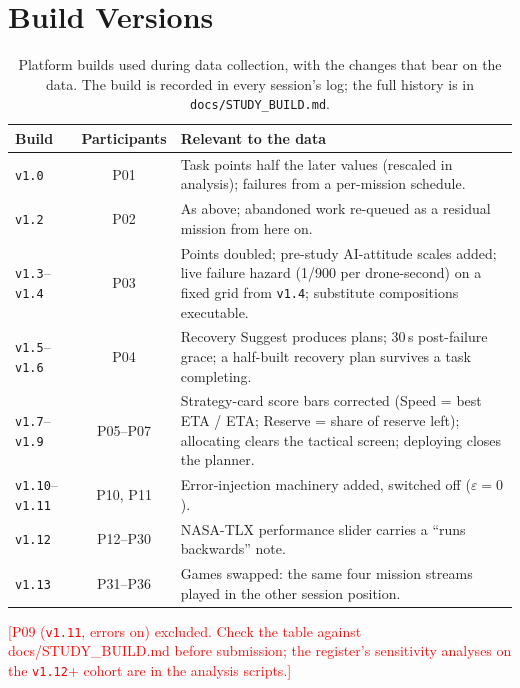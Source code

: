 \documentclass[10pt]{article}
\theoremstyle{definition}
\newcommand{\todo}[1]{\textcolor{red}{[#1]}}
\begin{document}
\section{Build Versions}\label{app:builds}

\begin{table}[htbp]
\centering
\caption{Platform builds used during data collection, with the changes that bear on the data. The build is recorded in
every session's log; the full history is in \texttt{docs/STUDY\_BUILD.md}.}
\label{tab:builds}
\small
\begin{tabularx}{\linewidth}{lcX}
\toprule
\textbf{Build} & \textbf{Participants} & \textbf{Relevant to the data} \\
\midrule
\texttt{v1.0} & P01 & Task points half the later values (rescaled in analysis); failures from a per-mission schedule. \\
\texttt{v1.2} & P02 & As above; abandoned work re-queued as a residual mission from here on. \\
\texttt{v1.3}--\texttt{v1.4} & P03 & Points doubled; pre-study AI-attitude scales added; live failure hazard (1/900 per drone-second) on a fixed grid from \texttt{v1.4}; substitute compositions executable. \\
\texttt{v1.5}--\texttt{v1.6} & P04 & Recovery Suggest produces plans; 30\,s post-failure grace; a half-built recovery plan survives a task completing. \\
\texttt{v1.7}--\texttt{v1.9} & P05--P07 & Strategy-card score bars corrected (Speed = best ETA / ETA; Reserve = share of reserve left); allocating clears the tactical screen; deploying closes the planner. \\
\texttt{v1.10}--\texttt{v1.11} & P10, P11 & Error-injection machinery added, switched off ($\varepsilon=0$). \\
\texttt{v1.12} & P12--P30 & NASA-TLX performance slider carries a ``runs backwards'' note. \\
\texttt{v1.13} & P31--P36 & Games swapped: the same four mission streams played in the other session position. \\
\bottomrule
\end{tabularx}
\end{table}

\todo{P09 (\texttt{v1.11}, errors on) excluded. Check the table against docs/STUDY\_BUILD.md before submission; the
register's sensitivity analyses on the \texttt{v1.12}+ cohort are in the analysis scripts.}


\end{document}
